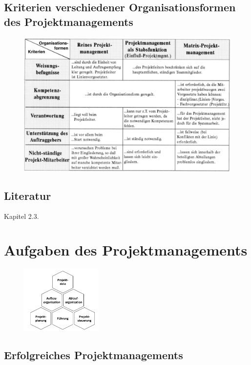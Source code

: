 \documentclass[11pt,a4paper]{article}
\begin{document}
\subsection{Kriterien verschiedener Organisationsformen des Projektmanagements}

\begin{figure}[H]
	\includegraphics[width=\textwidth]{kriterien}
\end{figure}

\subsection{Literatur}
Kapitel 2.3.

\pagebreak

\section{Aufgaben des Projektmanagements}

\begin{figure}[H]
\centering
	\includegraphics[width=0.36\textwidth]{hauptaufgaben}
\end{figure}


\subsection{Erfolgreiches Projektmanagements}
\end{document}
